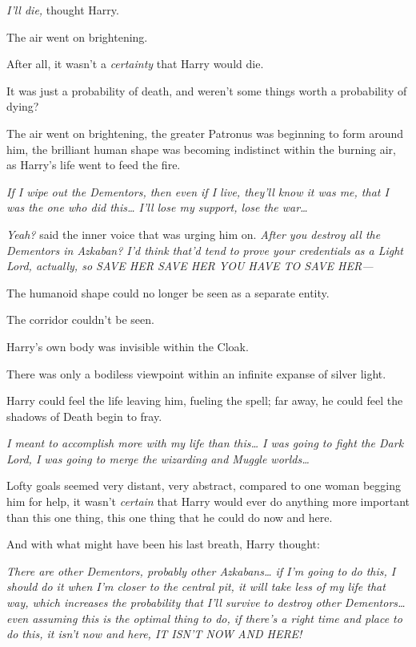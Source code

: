 \emph{I'll die,} thought Harry.

The air went on brightening.

After all, it wasn't a \emph{certainty} that Harry would die.

It was just a probability of death, and weren't some things worth a probability 
of dying?

The air went on brightening, the greater Patronus was beginning to form around 
him, the brilliant human shape was becoming indistinct within the burning air, 
as Harry's life went to feed the fire.

\emph{If I wipe out the Dementors, then even if I live, they'll know it was me, 
that I was the one who did this{\ldots} I'll lose my support, lose the 
war{\ldots}}

\emph{Yeah?} said the inner voice that was urging him on. \emph{After you 
destroy all the Dementors in Azkaban? I'd think that'd tend to prove your 
credentials as a Light Lord, actually, so SAVE HER SAVE HER YOU HAVE TO SAVE 
HER---}

The humanoid shape could no longer be seen as a separate entity.

The corridor couldn't be seen.

Harry's own body was invisible within the Cloak.

There was only a bodiless viewpoint within an infinite expanse of silver light.

Harry could feel the life leaving him, fueling the spell; far away, he could 
feel the shadows of Death begin to fray.

\emph{I meant to accomplish more with my life than this{\ldots} I was going to 
fight the Dark Lord, I was going to merge the wizarding and Muggle 
worlds{\ldots}}

Lofty goals seemed very distant, very abstract, compared to one woman begging 
him for help, it wasn't \emph{certain} that Harry would ever do anything more 
important than this one thing, this one thing that he could do now and here.

And with what might have been his last breath, Harry thought:

\emph{There are other Dementors, probably other Azkabans{\ldots} if I'm going 
to do this, I should do it when I'm closer to the central pit, it will take 
less of my life that way, which increases the probability that I'll survive to 
destroy other Dementors{\ldots} even assuming this is the optimal thing to do, 
if there's a right time and place to do this, it isn't now and here, IT ISN'T 
NOW AND HERE!}

